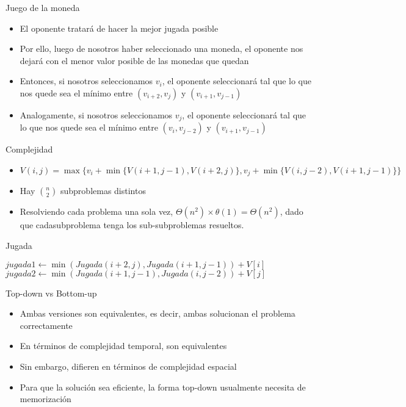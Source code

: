 \documentclass[]{beamer}
\begin{document}
\begin{frame}{Juego de la moneda}
  \begin{itemize}
    \item El oponente tratar\'a de hacer la mejor jugada posible
      \pause
    \item Por ello, luego de nosotros haber seleccionado una moneda, el oponente nos dejar\'a con el menor valor posible de las monedas que quedan
      \pause
    \item Entonces, si nosotros seleccionamos $v_i$, el oponente seleccionar\'a tal que lo que nos quede sea el m\'inimo entre $(v_{i+2}, v_j)$ y $(v_{i+1}, v_{j-1})$
      \pause
    \item Analogamente, si nosotros seleccionamos $v_j$, el oponente seleccionar\'a tal que lo que nos quede sea el m\'inimo entre $(v_{i}, v_{j-2})$ y $(v_{i+1}, v_{j-1})$
  \end{itemize}
\end{frame}

\begin{frame}{Complejidad}
  \begin{itemize}
    \item $V(i,j) = \max \biggl\{ v_i + \min \{V(i+1,j-1), V(i+2,j) \} , v_j + \min \{ V(i, j-2), V(i+1, j-1) \} \biggl\} $
      \pause
    \item Hay $\binom{n}{2}$ subproblemas distintos
      \pause
    \item Resolviendo cada problema una sola vez, $\Theta(n^2) \times \theta(1) = \Theta(n^2)$, dado que cadasubproblema tenga los sub-subproblemas resueltos.
  \end{itemize}
\end{frame}

\begin{frame}{Jugada}
  \begin{algorithm}[H]
    \BlankLine
    {
    }
    $jugada1 \leftarrow \min (Jugada(i+2, j) , Jugada(i+1, j-1)) + V[i]$ \;
    $jugada2 \leftarrow \min (Jugada(i+1, j-1) , Jugada(i, j-2)) + V[j]$ \;
  \end{algorithm}
\end{frame}

\begin{frame}{Top-down vs Bottom-up}
  \begin{itemize}
    \item Ambas versiones son equivalentes, es decir, ambas solucionan el problema correctamente
      \pause
    \item En t\'erminos de complejidad temporal, son equivalentes
      \pause
    \item Sin embargo, difieren en t\'erminos de complejidad espacial
      \pause
    \item Para que la soluci\'on sea eficiente, la forma top-down usualmente necesita de memorizaci\'on
  \end{itemize}
\end{frame}
\end{document}
